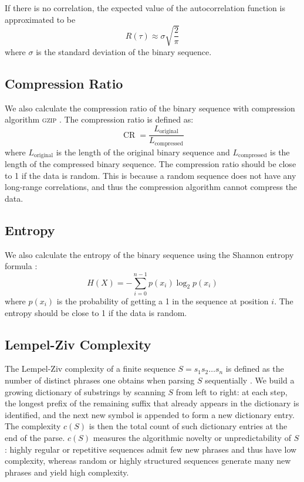 If there is no correlation, the expected value of the autocorrelation function is approximated to be
\begin{equation}
R(\tau) \approx \sigma \sqrt{\frac{2}{\pi}}
\end{equation}
where $\sigma$ is the standard deviation of the binary sequence. 

\subsection{Compression Ratio}
We also calculate the compression ratio of the binary sequence with compression algorithm \textsc{gzip} \cite{gzip}. The compression ratio is defined as:
\begin{equation}
\operatorname{CR} = \frac{L_{\text{original}}}{L_{\text{compressed}}}
\end{equation}
where $L_\text{original}$ is the length of the original binary sequence and $L_\text{compressed}$ is the length of the compressed binary sequence. The compression ratio should be close to 1 if the data is random. This is because a random sequence does not have any long-range correlations, and thus the compression algorithm cannot compress the data. 

\subsection{Entropy}
We also calculate the entropy of the binary sequence using the Shannon entropy formula \cite{shannon1948mathematical}:
\begin{equation}
H(X) = -\sum_{i=0}^{n-1} p(x_i) \log_2 p(x_i)
\end{equation}
where $p(x_i)$ is the probability of getting a 1 in the sequence at position $i$. The entropy should be close to 1 if the data is random. 

\subsection{Lempel-Ziv Complexity}
The Lempel-Ziv complexity of a finite sequence $S = s_1 s_2 \dots s_n$ is defined as the number of distinct phrases one obtains when parsing $S$ sequentially \cite{lempel1976complexity}. We build a growing dictionary of substrings by scanning $S$ from left to right: at each step, the longest prefix of the remaining suffix that already appears in the dictionary is identified, and the next new symbol is appended to form a new dictionary entry.  The complexity $c(S)$ is then the total count of such dictionary entries at the end of the parse.  $c(S)$ measures the algorithmic novelty or unpredictability of $S$: highly regular or repetitive sequences admit few new phrases and thus have low complexity, whereas random or highly structured sequences generate many new phrases and yield high complexity. 

